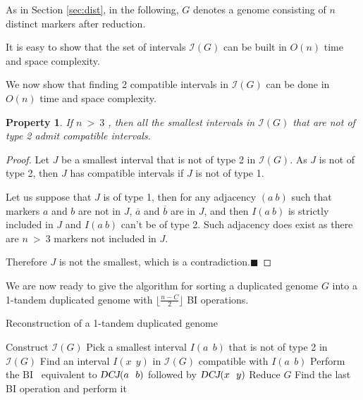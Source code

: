 \documentclass[11pt,final,twoside,nofrench]{thlifl}
\newcommand{\qed}{\ensuremath{\blacksquare}}
\newcommand{\snd}[1]{ \ensuremath{\overline{#1}} }
\def\BI{\ensuremath{\mbox{BI}}}
\def\DCJ{\ensuremath{\mbox{\sl DCJ}}}
\newtheorem{property}{Property}
\newtheorem{proof}{Proof}
\begin{document}
As in Section \ref{sec:dist}, in the following, $G$ denotes a genome consisting 
of $n$ distinct markers after reduction. 

It is easy to show that the set of intervals 
$\mathcal{I}(G)$ can be built in $O(n)$ time and space complexity.

We now show that finding 2 compatible intervals in  $\mathcal{I}(G)$ can be done in $O(n)$ time and space complexity.

\begin{property}

If $n~>~3$ , then all the smallest intervals in $\mathcal{I}(G)$ that are not of type 2 admit compatible intervals.
\label{smallestOK}
\end{property}

\begin{proof}

    Let $J$ be a smallest interval that is not of type 2 in
    $\mathcal{I}(G)$. As $J$ is not of type 2, then $J$ has compatible
    intervals if $J$ is not of type 1.

Let us suppose that $J$ is of type 1, then for any adjacency $(a ~ b)$ such 
that markers $a$ and $b$ are not in $J$,  $\snd{a}$ and $\snd{b}$ are in $J$, 
and then $I(a ~ b)$ is strictly included in $J$ and $I(a ~ b)$ can't be of 
type 2. Such adjacency does exist as there are $n~>~3$ markers not included in $J$.

Therefore $J$ is not the smallest, which is a contradiction.\qed

\end{proof}

We are now ready to give the algorithm for sorting a duplicated genome $G$ into a 1-tandem duplicated genome with $\lfloor \frac{n - C}{2} \rfloor$ BI operations.

\begin{algorithm}                      \caption{Reconstruction of a 1-tandem duplicated genome}          \label{alg1}                           \begin{algorithmic}[1]                    

\STATE Construct $\mathcal{I}(G)$
\STATE Pick a smallest interval $I(a ~~ b)$ that is not of type 2 in $\mathcal{I}(G)$
\STATE Find an interval $I(x ~~ y)$ in $\mathcal{I}(G)$ compatible with $I(a ~~ b)$
\STATE Perform the \BI ~ equivalent to $\DCJ(a ~~ b)$ followed by $\DCJ(x ~~ y)$
\STATE Reduce $G$
\ENDWHILE
{}
\STATE Find the last BI operation and perform it
\ENDIF
\end{algorithmic}
\end{algorithm}
\end{document}
